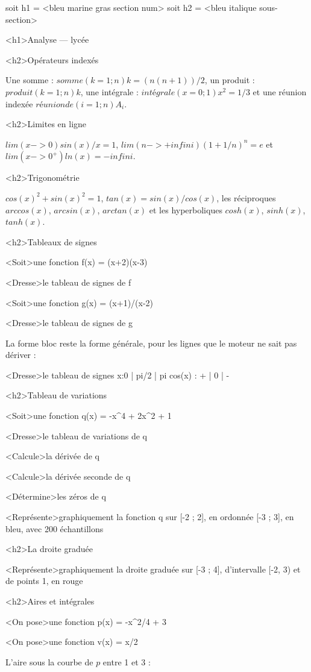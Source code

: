 \documentclass[marges=20, taille=11, precision=3]{texecole}
\begin{document}
soit h1 = <bleu marine gras section num>
soit h2 = <bleu italique sous-section>

<h1>Analyse — lycée


<h2>Opérateurs indexés

Une somme : $somme(k=1;n) k = (n(n+1))/2$, un produit :
$produit(k=1;n) k$, une intégrale : $intégrale(x=0;1) x^2 = 1/3$ et une réunion indexée $réunion de(i=1;n) A_i$.

<h2>Limites en ligne

$lim(x->0) sin(x)/x = 1$, $lim(n->+infini) (1 + 1/n)^n = e$ et
$lim(x->0^+) ln(x) = -infini$.

<h2>Trigonométrie

$cos(x)^2 + sin(x)^2 = 1$, $tan(x) = sin(x)/cos(x)$, les réciproques
$arccos(x)$, $arcsin(x)$, $arctan(x)$ et les hyperboliques $cosh(x)$,
$sinh(x)$, $tanh(x)$.

<h2>Tableaux de signes

<Soit>une fonction f(x) = (x+2)(x-3)

<Dresse>le tableau de signes de f

<Soit>une fonction g(x) = (x+1)/(x-2)

<Dresse>le tableau de signes de g

La forme bloc reste la forme générale, pour les lignes que le moteur ne sait pas dériver :

<Dresse>le tableau de signes x:{0 | pi/2 | pi} {
	cos(x) : + | 0 | -
}

<h2>Tableau de variations

<Soit>une fonction q(x) = -x^4 + 2x^2 + 1

<Dresse>le tableau de variations de q

<Calcule>la dérivée de q

<Calcule>la dérivée seconde de q

<Détermine>les zéros de q

<Représente>graphiquement la fonction q sur [-2 ; 2], en ordonnée [-3 ; 3], en bleu, avec 200 échantillons

<h2>La droite graduée

<Représente>graphiquement la droite graduée sur [-3 ; 4], d'intervalle {[-2, 3)} et de points {1}, en rouge

<h2>Aires et intégrales

<On pose>une fonction p(x) = -x^2/4 + 3

<On pose>une fonction v(x) = x/2

L'aire sous la courbe de $p$ entre 1 et 3 :
\end{document}
